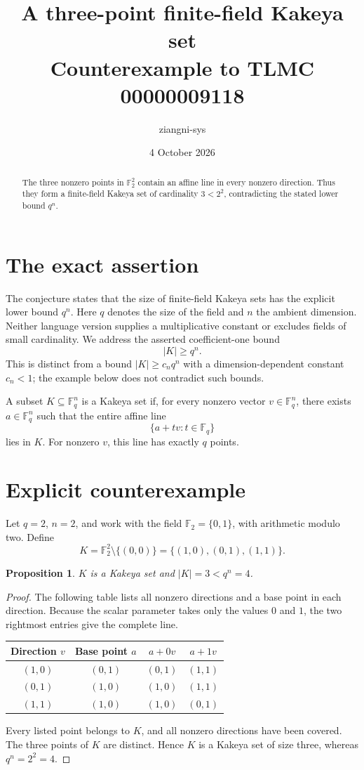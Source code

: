 \documentclass[11pt]{article}
\title{A three-point finite-field Kakeya set\\\large Counterexample to TLMC 00000009118}
\author{ziangni-sys}
\date{4 October 2026}
\newtheorem{proposition}{Proposition}
\begin{document}
\maketitle
\begin{abstract}
The three nonzero points in $\mathbb F_2^2$ contain an affine line in
every nonzero direction. Thus they form a finite-field Kakeya set of
cardinality $3<2^2$, contradicting the stated lower bound $q^n$.
\end{abstract}

\section{The exact assertion}
The conjecture states that the size of finite-field Kakeya sets has the
explicit lower bound $q^n$. Here $q$ denotes the size of the field and
$n$ the ambient dimension. Neither language version supplies a
multiplicative constant or excludes fields of small cardinality.
We address the asserted coefficient-one bound
\[
 |K|\geq q^n.
\]
This is distinct from a bound $|K|\geq c_n q^n$ with a dimension-dependent
constant $c_n<1$; the example below does not contradict such bounds.

A subset $K\subseteq\mathbb F_q^n$ is a Kakeya set if, for every
nonzero vector $v\in\mathbb F_q^n$, there exists $a\in\mathbb F_q^n$
such that the entire affine line
\[
 \{a+tv:t\in\mathbb F_q\}
\]
lies in $K$. For nonzero $v$, this line has exactly $q$ points.

\section{Explicit counterexample}
Let $q=2$, $n=2$, and work with the field
$\mathbb F_2=\{0,1\}$, with arithmetic modulo two. Define
\[
 K=\mathbb F_2^2\setminus\{(0,0)\}
  =\{(1,0),(0,1),(1,1)\}.
\]
\begin{proposition}
$K$ is a Kakeya set and $|K|=3<q^n=4$.
\end{proposition}
\begin{proof}
The following table lists all nonzero directions and a base point in
each direction. Because the scalar parameter takes only the values
$0$ and $1$, the two rightmost entries give the complete line.
\begin{center}
\begin{tabular}{cccc}
\toprule
Direction $v$ & Base point $a$ & $a+0v$ & $a+1v$\\
\midrule
$(1,0)$ & $(0,1)$ & $(0,1)$ & $(1,1)$\\
$(0,1)$ & $(1,0)$ & $(1,0)$ & $(1,1)$\\
$(1,1)$ & $(1,0)$ & $(1,0)$ & $(0,1)$\\
\bottomrule
\end{tabular}
\end{center}
Every listed point belongs to $K$, and all nonzero directions have
been covered. The three points of $K$ are distinct. Hence $K$ is a
Kakeya set of size three, whereas $q^n=2^2=4$.
\end{proof}
\end{document}

